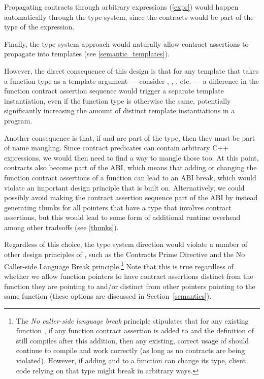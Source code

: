 Propagating contracts through arbitrary expressions (\ref{expr}) would happen automatically through the type system, since the contracts would be part of the type of the expression.

Finally, the type system approach would naturally allow contract assertions to propagate into templates (see \ref{semantic_templates}). 

However, the direct consequence of this design is that for any template that takes a function type as a template argument --- consider , , , etc. --- a difference in the function contract assertion sequence would trigger a separate template instantiation, even if the function type is otherwise the same, potentially significantly increasing the amount of distinct template instantiations in a program. 

Another consequence is that, if  and  are part of the type,  then they must be part of name mangling. Since contract predicates can contain arbitrary C++ expressions, we would then need to find a way to mangle those too. At this point, contracts also become part of the ABI, which means that adding or changing the function contract assertions of a function can lead to an ABI break, which would violate an important design principle that \cite{P2900R8} is built on. Alternatively, we could possibly avoid making the contract assertion sequence part of the ABI by instead generating thunks for all pointers that have a type that involves contract assertions, but this would lead to some form of additional runtime overhead among other tradeoffs (see \ref{thunks}).

Regardless of this choice, the type system direction would violate a number of other design principles of \cite{P2900R8}, such as the Contracts Prime Directive and the No Caller-side Language Break principle.\footnote{ The \emph{No caller-side language break} principle stipulates that for any existing function , if any function contract assertion is added to  and the definition of  still compiles after this addition, then any existing, correct usage of  should continue to compile and work correctly (as long as no contracts are being violated). However, if adding  and  to a function can change its type, client code relying on that type might break in arbitrary ways.} Note that this is true regardless of whether we allow function pointers to have contract assertions distinct from the function they are pointing to and/or distinct from other pointers pointing to the same function (these options are discussed in Section~\ref{semantics}).

